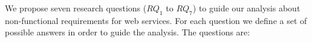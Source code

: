 \documentclass{sig-alternate}
\begin{document}

% 

We propose seven research questions ($RQ_1$ to $RQ_7$) to guide our analysis about non-functional
requirements for web services. 
For each question we define a set of possible answers in order to guide
the analysis.
The questions are:
\end{document}
